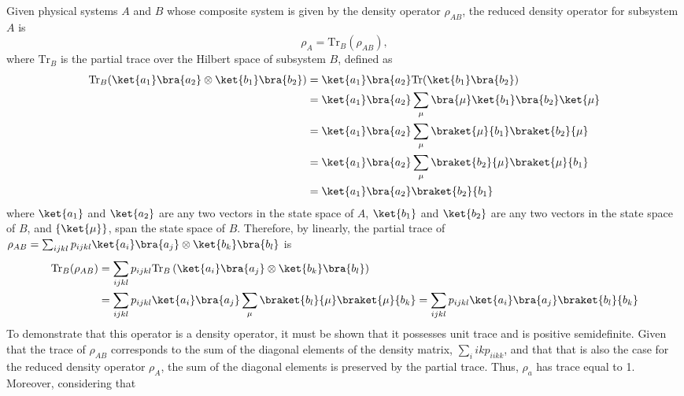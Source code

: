 Given physical systems $A$ and $B$ whose composite system is given by the density operator $\rho_{AB}$, the reduced density operator for subsystem $A$ is $$\rho_{A} = \text{Tr}_{B}(\rho_{AB}),$$ where $ \text{Tr}_{B}$ is the partial trace over the Hilbert space of subsystem $B$, defined as 
\begin{align*}
  \text{Tr}_{B}(\ket{a_1}\bra{a_2} \otimes \ket{b_1}\bra{b_2}) & =\ket{a_1}\bra{a_2}\text{Tr}(\ket{b_1}\bra{b_2}) \\
  & = \ket{a_1}\bra{a_2}  \sum_{\mu} \bra{\mu} \ket{b_1}\bra{b_2} \ket{\mu} \\
  & =  \ket{a_1} \bra{a_2} \sum_{\mu} \braket{\mu} {b_1}\braket{b_2} {\mu} \\
  & = \ket{a_1} \bra{a_2} \sum_{\mu} \braket{b_2}{\mu} \braket{\mu}{b_1} \\
  &= \ket{a_1}\bra{a_2}  \braket{b_2}{b_1}
\end{align*}
 where $\ket{a_1}$ and $\ket{a_2}$ are any two vectors in the state space of $A$,  $\ket{b_1}$ and $\ket{b_2}$ are any two vectors in the state space of $B$, and $\{\ket{\mu}\}$, span the state space of $B$.  Therefore, by linearly, the partial trace of $\rho_{AB} = \sum_{ijkl} p_{ijkl} \ket{a_i} \bra{a_j}  \otimes \ket{b_k} \bra{b_l}$ is
\begin{align*}
  \text{Tr}_{B}(\rho_{AB}) &= \sum_{ijkl} p_{ijkl} \text{Tr}_{B}\left(\ket{a_i}\bra{a_j} \otimes \ket{b_k} \bra{b_l}\right) \\
  & = \sum_{ijkl} p_{ijkl} \ket{a_i}\bra{a_j}  \sum_{\mu} \braket{b_l}{\mu} \braket{\mu}{b_k}= \sum_{ijkl} p_{ijkl} \ket{a_i}\bra{a_j}   \braket{b_l}{b_k} 
\end{align*} 
To demonstrate that this operator is a density operator, it must be shown that it possesses unit trace and is positive semidefinite. Given that the trace of $\rho_{AB}$ corresponds to the sum of the diagonal elements of the density matrix, $\sum_i{ik} p_{iikk}$, and that that is also the case for the reduced density operator $\rho_{A}$, the sum of the diagonal elements is preserved by the partial trace. Thus, $\rho_{a}$ has trace equal to 1.  Moreover, considering that %

